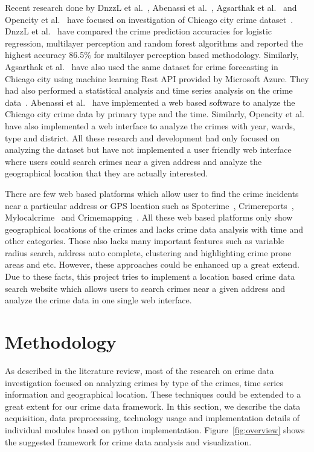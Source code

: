 Recent research done by DnzzL et al.~\cite{hid-sp18-409-dnzzl},
Abenassi et al.~\cite{hid-sp18-409-abenassi}, Agsarthak et
al.~\cite{hid-sp18-409-agsarthak} and Opencity et
al.~\cite{hid-sp18-409-open-city} have focused on investigation of
Chicago city crime dataset~\cite{hid-sp18-409-www-data.gov}.  DnzzL et
al.~\cite{hid-sp18-409-dnzzl} have compared the crime prediction
accuracies for logistic regression, multilayer perception and random
forest algorithms and reported the highest accuracy 86.5\% for
multilayer perception based methodology. Similarly, Agsarthak et
al.~\cite{hid-sp18-409-agsarthak} have also used the same dataset for
crime forecasting in Chicago city using machine learning Rest API
provided by Microsoft Azure. They had also performed a statistical
analysis and time series analysis on the crime
data~\cite{hid-sp18-409-agsarthak}. Abenassi et
al.~\cite{hid-sp18-409-abenassi} have implemented a web based software
to analyze the Chicago city crime data by primary type and the
time. Similarly, Opencity et al.~\cite{hid-sp18-409-open-city} have
also implemented a web interface to analyze the crimes with year,
wards, type and district. All these research and development had only
focused on analyzing the dataset but have not implemented a user
friendly web interface where users could search crimes near a given
address and analyze the geographical location that they are actually
interested.

There are few web based platforms which allow user to find the crime
incidents near a particular address or GPS location such as
Spotcrime~\cite{hid-sp18-409-www-spotcrime},
Crimereports~\cite{hid-sp18-409-www-crimereports},
Mylocalcrime~\cite{hid-sp18-409-www-mylocalcrime} and
Crimemapping~\cite{hid-sp18-409-www-crimemapping}. All these web based
platforms only show geographical locations of the crimes and lacks
crime data analysis with time and other categories. Those also lacks
many important features such as variable radius search, address auto
complete, clustering and highlighting crime prone areas and
etc. However, these approaches could be enhanced up a great extend.
Due to these facts, this project tries to implement a location based
crime data search website which allows users to search crimes near a
given address and analyze the crime data in one single web interface.

\section{Methodology}
As described in the literature review, most of the research on crime
data investigation focused on analyzing crimes by type of the crimes,
time series information and geographical location. These techniques
could be extended to a great extent for our crime data framework. In
this section, we describe the data acquisition, data preprocessing,
technology usage and implementation details of individual modules
based on python implementation. Figure~\ref{fig:overview} shows the
suggested framework for crime data analysis and visualization.

